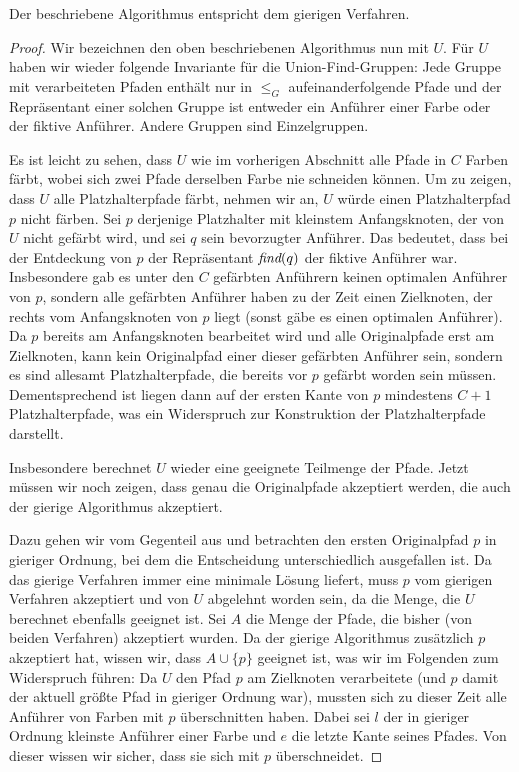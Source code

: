 \begin{lemma}
    Der beschriebene Algorithmus entspricht dem gierigen Verfahren.
\end{lemma}
\begin{proof}
    Wir bezeichnen den oben beschriebenen Algorithmus nun mit $U$.
    Für $U$ haben wir wieder folgende Invariante für die Union-Find-Gruppen:
    Jede Gruppe mit verarbeiteten Pfaden enthält nur in $\leq_G$ aufeinanderfolgende Pfade und der Repräsentant einer
    solchen Gruppe ist entweder ein Anführer einer Farbe oder der fiktive Anführer.
    Andere Gruppen sind Einzelgruppen.
    
    Es ist leicht zu sehen, dass $U$ wie im vorherigen Abschnitt alle Pfade in $C$ Farben färbt, wobei sich zwei Pfade
    derselben Farbe nie schneiden können.
    Um zu zeigen, dass $U$ alle Platzhalterpfade färbt, nehmen wir an, $U$ würde einen Platzhalterpfad $p$ nicht färben. 
    Sei $p$ derjenige Platzhalter mit kleinstem Anfangsknoten, der von $U$ nicht gefärbt wird, und sei $q$ sein bevorzugter Anführer.
    Das bedeutet, dass bei der Entdeckung von $p$ der Repräsentant $\text{\em find}(q)$ der fiktive Anführer war.
    Insbesondere gab es unter den $C$ gefärbten Anführern keinen optimalen Anführer von $p$, sondern alle gefärbten Anführer
    haben zu der Zeit einen Zielknoten, der rechts vom Anfangsknoten von $p$ liegt (sonst gäbe es einen optimalen Anführer).
    Da $p$ bereits am Anfangsknoten bearbeitet wird und alle Originalpfade erst am Zielknoten, kann kein Originalpfad einer 
    dieser gefärbten Anführer sein, sondern es sind allesamt Platzhalterpfade, die bereits vor $p$ gefärbt worden sein müssen.
    Dementsprechend ist liegen dann auf der ersten Kante von $p$ mindestens $C+1$ Platzhalterpfade, was ein Widerspruch zur Konstruktion
    der Platzhalterpfade darstellt.
    
    Insbesondere berechnet $U$ wieder eine geeignete Teilmenge der Pfade.
    Jetzt müssen wir noch zeigen, dass genau die Originalpfade akzeptiert werden, die auch der gierige Algorithmus
    akzeptiert.

    Dazu gehen wir vom Gegenteil aus und betrachten den ersten Originalpfad $p$ in gieriger Ordnung, bei dem die
    Entscheidung unterschiedlich ausgefallen ist.
    Da das gierige Verfahren immer eine minimale Lösung liefert, muss $p$ vom gierigen Verfahren akzeptiert und von
    $U$ abgelehnt worden sein, da die Menge, die $U$ berechnet ebenfalls geeignet ist.
    Sei $A$ die Menge der Pfade, die bisher (von beiden Verfahren) akzeptiert wurden.
    Da der gierige Algorithmus zusätzlich $p$ akzeptiert hat, wissen wir, dass $A \cup \{p\}$ geeignet ist, was wir
    im Folgenden zum Widerspruch führen:
    Da $U$ den Pfad $p$ am Zielknoten verarbeitete (und $p$ damit der aktuell größte Pfad in gieriger Ordnung
    war), mussten sich zu dieser Zeit alle Anführer von Farben mit $p$ überschnitten haben.
    Dabei sei $l$ der in gieriger Ordnung kleinste Anführer einer Farbe und $e$ die letzte Kante seines Pfades.
    Von dieser wissen wir sicher, dass sie sich mit $p$ überschneidet.


\end{proof}
